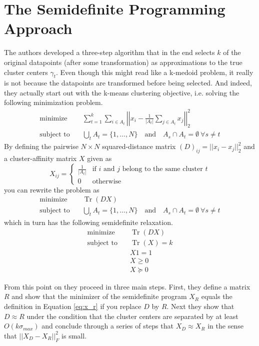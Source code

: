 \documentclass[10pt,a4paper]{article}
\DeclareMathOperator{\Tr}{Tr}
\begin{document}
\section{The Semidefinite Programming Approach}
\label{sec:approach}

The authors developed a three-step algorithm that in the end selects $k$ of the original datapoints (after some transformation) as approximations to the true cluster centers $\gamma_{t}$.
Even though this might read like a k-medoid problem, it really is not because the datapoints are transformed before being selected.
And indeed, they actually start out with the k-means clustering objective, i.e. solving the following minimization problem.
\begin{align*}
  \text{minimize} \quad & \sum_{t = 1}^{k} \sum_{i \in A_{t}} \left|\left| x_{i} - \frac{1}{|A_{t}|} \sum_{j \in A_{t}} x_{j} \right|\right|_{2}^{2}\\
  \text{subject to} \quad & \bigcup_{t} A_{t} = \{ 1, \dots, N \} \quad \text{and} \quad A_{s} \cap A_{t} = \emptyset~\forall s \ne t
\end{align*}
By defining the pairwise $N \times N$ squared-distance matrix $(D)_{ij} = ||x_{i} - x_{j}||_{2}^{2}$ and a cluster-affinity matrix $X$ given as
\begin{equation}
  X_{ij} = \begin{cases}
    \frac{1}{|A_{t}|} & \text{if $i$ and $j$ belong to the same cluster $t$}\\
    0 & \text{otherwise}
  \end{cases}
  \label{eq:x_r}
\end{equation}
you can rewrite the problem as
\begin{align*}
  \text{minimize} \quad & \Tr(DX)\\
  \text{subject to} \quad & \bigcup_{t} A_{t} = \{ 1, \dots, N \} \quad \text{and} \quad A_{s} \cap A_{t} = \emptyset~\forall s \ne t
\end{align*}
which in turn has the following semidefinite relaxation.
\begin{align*}
  \text{minimize} \quad & \Tr(DX)\\
  \text{subject to} \quad & \Tr(X) = k\\
                        & X1 = 1\\
                        & X \ge 0\\
                        & X \succeq 0
\end{align*}

From this point on they proceed in three main steps.
First, they define a matrix $R$ and show that the minimizer of the semidefinite program $X_{R}$ equals the definition in Equation \eqref{eq:x_r} if you replace $D$ by $R$.
Next they show that $D \approx R$ under the condition that the cluster centers are separated by at least $O(k\sigma_{max})$ and conclude through a series of steps that $X_{D} \approx X_{R}$ in the sense that $||X_{D} - X_{R}||_{F}^{2}$ is small.
\end{document}
